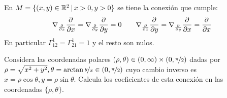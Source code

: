  \begin{ejer}
     [5.16]  En $M = \{(x, y) \in \mathbb{R}^2 \, | \, x > 0, y > 0\}$ se tiene la conexi\'on que cumple:
     $$\nabla_{\frac{\partial }{\partial x}} \dfrac{\partial^{} }{\partial x} = \nabla_{\frac{\partial }{\partial y}} \dfrac{\partial^{} }{\partial y} = 0 \qquad \nabla_{\frac{\partial }{\partial x}} \dfrac{\partial^{} }{\partial y} = \nabla_{\frac{\partial }{\partial y}} \dfrac{\partial^{} }{\partial x} = \dfrac{\partial^{} }{\partial x}$$
     En particular $\Gamma_{12}^1 = \Gamma_{21}^1 = 1$ y el resto son nulos.

     Considera las coordenadas polares $(\rho, \theta) \in (0,\infty)\times(0, \nicefrac{\pi}{2})$ dadas por $\rho= \sqrt{ x^2 + y^2},\theta = \arctan \nicefrac{y}{x} \in (0, \nicefrac{\pi}{2})$ cuyo cambio inverso es $x = \rho \cos \theta, y = \rho \sin \theta$. Calcula los coeficientes
de esta conexi\'on en las coordenadas $\{\rho, \theta\}$.
 \end{ejer}
